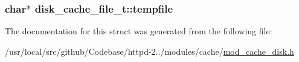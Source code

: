 \subsubsection[{\texorpdfstring{tempfile}{tempfile}}]{\setlength{\rightskip}{0pt plus 5cm}char$\ast$ disk\+\_\+cache\+\_\+file\+\_\+t\+::tempfile}\hypertarget{structdisk__cache__file__t_af0e439775beb63c06cf938f9e3eef29d}{}\label{structdisk__cache__file__t_af0e439775beb63c06cf938f9e3eef29d}


The documentation for this struct was generated from the following file\+:\begin{DoxyCompactItemize}
\item 
/usr/local/src/github/\+Codebase/httpd-\/2../modules/cache/\hyperlink{mod__cache__disk_8h}{mod\+\_\+cache\+\_\+disk.\+h}\end{DoxyCompactItemize}

